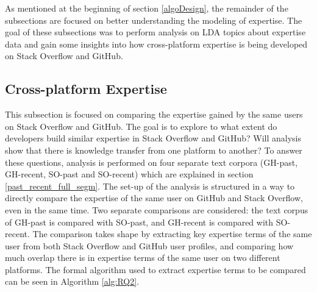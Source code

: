         As mentioned at the beginning of section \ref{algoDesign}, the remainder of the subsections are focused on better understanding the modeling of expertise. The goal of these subsections was to perform analysis on LDA topics about expertise data and gain some insights into how cross-platform expertise is being developed on Stack Overflow and GitHub.
    
    \subsection{Cross-platform Expertise\label{RQ2_task}}
    
        This subsection is focused on comparing the expertise gained by the same users on Stack Overflow and GitHub. The goal is to explore to what extent do developers build similar expertise in Stack Overflow and GitHub? Will analysis show that there is knowledge transfer from one platform to another? To answer these questions, analysis is performed on four separate text corpora (GH-past, GH-recent, SO-past and SO-recent) which are explained in section \ref{past_recent_full_segm}. The set-up of the analysis is structured in a way to directly compare the expertise of the same user on GitHub and Stack Overflow, even in the same time. Two separate comparisons are considered: the text corpus of GH-past is compared with SO-past, and GH-recent is compared with SO-recent. The comparison takes shape by extracting key expertise terms of the same user from both Stack Overflow and GitHub user profiles, and comparing how much overlap there is in expertise terms of the same user on two different platforms. The formal algorithm used to extract expertise terms to be compared can be seen in Algorithm \ref{alg:RQ2}.
        
